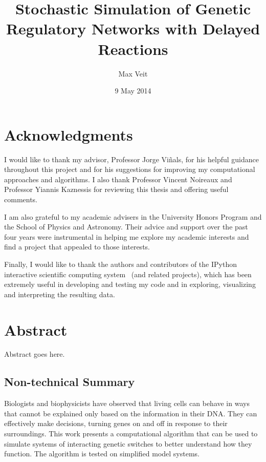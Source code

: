 \documentclass[english,letterpaper,12pt]{report}
\begin{document}
\title{Stochastic Simulation of Genetic Regulatory Networks with Delayed Reactions}
\author{Max Veit}
\date{9 May 2014}


\maketitle

\chapter*{Acknowledgments} %
\label{sec:acknowledgements}

I would like to thank my advisor, Professor Jorge Viñals, for his helpful guidance throughout this project and for his suggestions for improving my computational approaches and algorithms. I also thank Professor Vincent Noireaux and Professor Yiannis Kaznessis for reviewing this thesis and offering useful comments.

I am also grateful to my academic advisers in the University Honors Program and the School of Physics and Astronomy. Their advice and support over the past four years were instrumental in helping me explore my academic interests and find a project that appealed to those interests. 

Finally, I would like to thank the authors and contributors of the IPython interactive scientific computing system~\cite{PER-GRA:2007} (and related projects), which has been extremely useful in developing and testing my code and in exploring, visualizing and interpreting the resulting data.

\chapter*{Abstract}
Abstract goes here.

\section*{Non-technical Summary}
Biologists and biophysicists have observed that living cells can behave in ways that cannot be explained only based on the information in their DNA. They can effectively make decisions, turning genes on and off in response to their surroundings. This work presents a computational algorithm that can be used to simulate systems of interacting genetic switches to better understand how they function. The algorithm is tested on simplified model systems.
\end{document}
